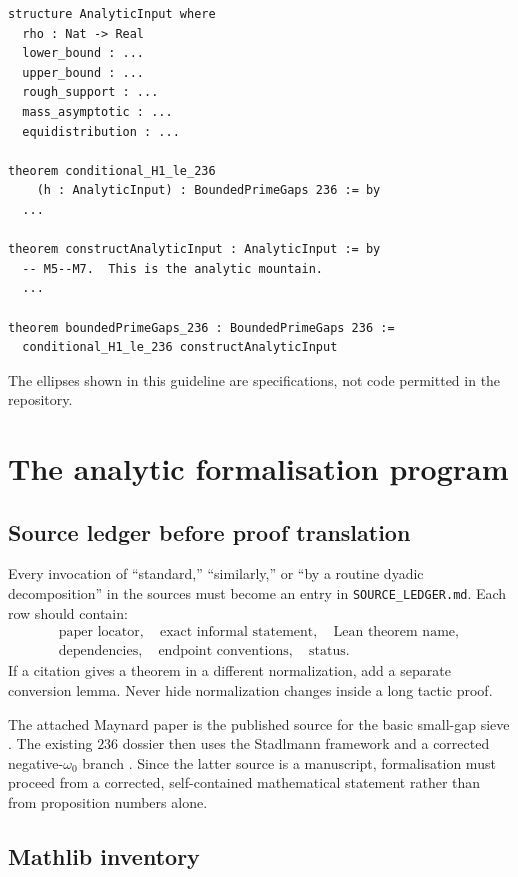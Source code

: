 \documentclass[11pt]{article}
\newcommand{\leanname}[1]{\texttt{#1}}
\begin{document}
\begin{lstlisting}
structure AnalyticInput where
  rho : Nat -> Real
  lower_bound : ...
  upper_bound : ...
  rough_support : ...
  mass_asymptotic : ...
  equidistribution : ...

theorem conditional_H1_le_236
    (h : AnalyticInput) : BoundedPrimeGaps 236 := by
  ...

theorem constructAnalyticInput : AnalyticInput := by
  -- M5--M7.  This is the analytic mountain.
  ...

theorem boundedPrimeGaps_236 : BoundedPrimeGaps 236 :=
  conditional_H1_le_236 constructAnalyticInput
\end{lstlisting}

The ellipses shown in this guideline are specifications, not code permitted in
the repository.

\section{The analytic formalisation program}

\subsection{Source ledger before proof translation}

Every invocation of ``standard,'' ``similarly,'' or ``by a routine dyadic
decomposition'' in the sources must become an entry in
\leanname{SOURCE\_LEDGER.md}.  Each row should contain:
\[
\begin{gathered}
\text{paper locator},\quad \text{exact informal statement},\quad
\text{Lean theorem name},\\
\text{dependencies},\quad \text{endpoint conventions},\quad
\text{status}.
\end{gathered}
\]
If a citation gives a theorem in a different normalization, add a separate
conversion lemma.  Never hide normalization changes inside a long tactic
proof.

The attached Maynard paper is the published source for the basic small-gap
sieve \cite{Maynard2015}.  The existing \(236\) dossier then uses the
Stadlmann framework and a corrected negative-\(\omega_0\) branch
\cite{Stadlmann2026}.  Since the latter source is a manuscript, formalisation
must proceed from a corrected, self-contained mathematical statement rather
than from proposition numbers alone.

\subsection{Mathlib inventory}
\end{document}
